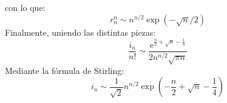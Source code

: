   con lo que:
  \begin{equation*}
    r_n^n
     \sim n^{n/2} \exp(- \sqrt{n} / 2)
  \end{equation*}
  Finalmente,
  uniendo las distintas piezas:
  \begin{equation*}
    \frac{i_n}{n!}
      \sim \frac{\mathrm{e}^{\frac{n}{2} + \sqrt{n} - \frac{1}{4}}}
		{2 n^{n/2} \sqrt{\pi n}}
  \end{equation*}
  Mediante la fórmula de Stirling:%
  \begin{equation}
    \label{eq:ae:involutions}
    i_n
      \sim \frac{1}{\sqrt{2}} n^{n/2}
	      \exp \left(
		     - \frac{n}{2} + \sqrt{n} - \frac{1}{4}
		   \right)
  \end{equation}

